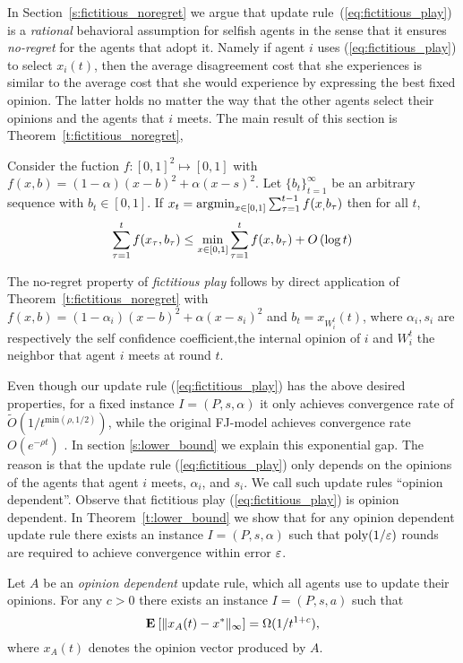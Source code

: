 In Section~\ref{s:fictitious_noregret} we argue that update rule~(\ref{eq:fictitious_play})
is a \emph{rational} behavioral assumption for selfish agents in the sense that 
it ensures \emph{no-regret} for the agents that adopt it. Namely if agent $i$ uses (\ref{eq:fictitious_play})
to select $x_i(t)$, then the average disagreement cost that she experiences is similar to the average cost that she would experience
by expressing the best fixed opinion. The latter holds no matter the way that the other agents select
their opinions and the agents that $i$ meets. The main result of this section is Theorem~\ref{t:fictitious_noregret},
\begin{theorem}\label{t:fictitious_noregret}
Consider the fuction $f:[0,1]^2 \mapsto [0,1]$ with $f(x,b) = (1-\alpha)(x-b)^2 + \alpha(x-s)^2$.
Let $\{b_t\}_{t=1}^\infty$ be an arbitrary sequence with $b_t \in [0,1]$. If $x_t = \operatorname*{argmin}_{x \in [0,1]}\sum_{\tau=1}^{t-1}f(x_,b_\tau)$
then for all $t$, 
\[\sum_{\tau=1}^{t}f(x_\tau,b_\tau) \leq \min_{x \in [0,1]}\sum_{\tau=1}^tf(x,b_\tau) + O\left(\log t\right)\]
\end{theorem}
The no-regret property of \emph{fictitious play} follows by direct application of Theorem~\ref{t:fictitious_noregret} 
with $f(x,b) = (1-\alpha_i)(x-b)^2 + \alpha(x-s_i)^2$ and $b_t = x_{W_i^t}(t)$, where $\alpha_i,s_i$ are 
respectively the self confidence coefficient,the internal opinion of $i$ and $W_i^t$ the neighbor 
that agent $i$ meets at round $t$.

Even though our update rule (\ref{eq:fictitious_play}) has the above
desired properties, for a fixed instance $I=(P,s,\alpha)$ it only achieves convergence rate of
$\widetilde{O}(1/t^{\text{min}(\rho,1/2)})$, while the original FJ-model
achieves convergence rate $O(e^{-\rho t})$ \cite{GS14}.
In section \ref{s:lower_bound} we explain this exponential gap.
The reason is that the update rule (\ref{eq:fictitious_play})
only depends on the opinions of the agents that agent $i$ meets,
$\alpha_i$, and $s_i$. We call such update rules \enquote{opinion dependent}.
Observe that fictitious play (\ref{eq:fictitious_play}) is opinion dependent.
  In Theorem~\ref{t:lower_bound} we
show that for any opinion dependent update rule there exists an instance
$I = (P,s,\alpha)$ such that $\mathrm{poly}(1/\varepsilon)$ rounds are required to
achieve convergence within error $\varepsilon$.
\begin{theorem}\label{t:lower_bound}
  Let $A$ be an \emph{opinion dependent} update rule, which all
  agents use to update their opinions.
  For any $c>0$ there exists an instance $I=(P,s,a)$ such that
  \[
    \Exp{\norm{\infty}{x_A(t) - x^*}} = \Omega(1/t^{1+c}),
  \]
where $x_A(t)$ denotes the opinion vector produced by $A$.
\end{theorem}

